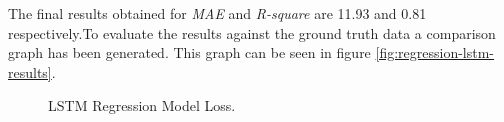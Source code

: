 The final results obtained for \textit{MAE} and \textit{R-square} are 11.93 and 0.81 respectively.To evaluate the results against the ground truth data a comparison graph has been generated.
This graph can be seen in figure \ref{fig:regression-lstm-results}.

\begin{figure}[H]
\begin{center}
\end{center}
\decoRule
\caption[LSTM Regression Model Loss]{LSTM Regression Model Loss.}
\label{fig:regression-lstm-loss}\end{figure}

